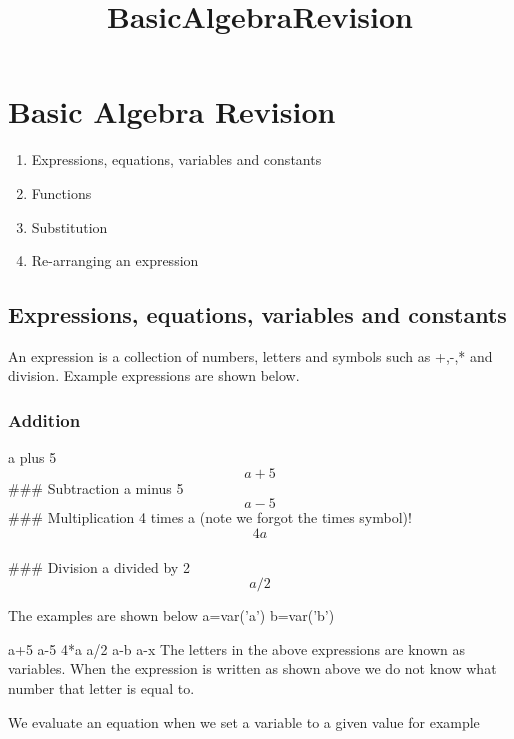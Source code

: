 \documentclass[11pt]{article}
\title{BasicAlgebraRevision}
\providecommand{\tightlist}{%
      \setlength{\itemsep}{0pt}\setlength{\parskip}{0pt}}
\begin{document}
    
    
    \maketitle
    
    

    
    \hypertarget{basic-algebra-revision}{%
\section{Basic Algebra Revision}\label{basic-algebra-revision}}

\begin{enumerate}
\def\labelenumi{\arabic{enumi}.}
\tightlist
\item
  Expressions, equations, variables and constants
\item
  Functions
\item
  Substitution
\item
  Re-arranging an expression
\end{enumerate}

    \hypertarget{expressions-equations-variables-and-constants}{%
\subsection{Expressions, equations, variables and
constants}\label{expressions-equations-variables-and-constants}}

An expression is a collection of numbers, letters and symbols such as
+,-,* and division. Example expressions are shown below.

    \hypertarget{addition}{%
\subsubsection{Addition}\label{addition}}

a plus 5 \[ a + 5 \] \#\#\# Subtraction a minus 5 \[  a-5 \] \#\#\#
Multiplication 4 times a (note we forgot the times symbol)! \[ 4a \]\\
\#\#\# Division a divided by 2 \[ a/2 \]

The examples are shown below
a=var('a')
b=var('b')

a+5
a-5
4*a
a/2
a-b
a-x
    The letters in the above expressions are known as variables. When the
expression is written as shown above we do not know what number that
letter is equal to.

We evaluate an equation when we set a variable to a given value for
example
\end{document}
